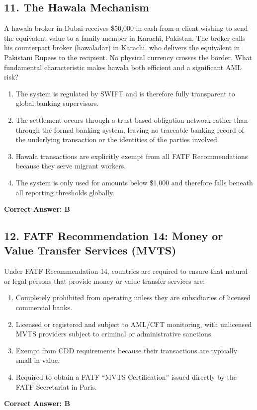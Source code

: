 \documentclass[11pt,a4paper]{article}
\begin{document}
	\subsection{11. The Hawala Mechanism}
	A hawala broker in Dubai receives \$50,000 in cash from a client wishing to send the equivalent value to a family member in Karachi, Pakistan. The broker calls his counterpart broker (hawaladar) in Karachi, who delivers the equivalent in Pakistani Rupees to the recipient. No physical currency crosses the border. What fundamental characteristic makes hawala both efficient and a significant AML risk?
	\begin{enumerate}[label=\Alph*.]
		\item The system is regulated by SWIFT and is therefore fully transparent to global banking supervisors.
		\item The settlement occurs through a trust-based obligation network rather than through the formal banking system, leaving no traceable banking record of the underlying transaction or the identities of the parties involved.
		\item Hawala transactions are explicitly exempt from all FATF Recommendations because they serve migrant workers.
		\item The system is only used for amounts below \$1,000 and therefore falls beneath all reporting thresholds globally.
	\end{enumerate}
	\textbf{Correct Answer: B}
	
	\subsection{12. FATF Recommendation 14: Money or Value Transfer Services (MVTS)}
	Under FATF Recommendation 14, countries are required to ensure that natural or legal persons that provide money or value transfer services are:
	\begin{enumerate}[label=\Alph*.]
		\item Completely prohibited from operating unless they are subsidiaries of licensed commercial banks.
		\item Licensed or registered and subject to AML/CFT monitoring, with unlicensed MVTS providers subject to criminal or administrative sanctions.
		\item Exempt from CDD requirements because their transactions are typically small in value.
		\item Required to obtain a FATF ``MVTS Certification'' issued directly by the FATF Secretariat in Paris.
	\end{enumerate}
	\textbf{Correct Answer: B}
	
\end{document}
